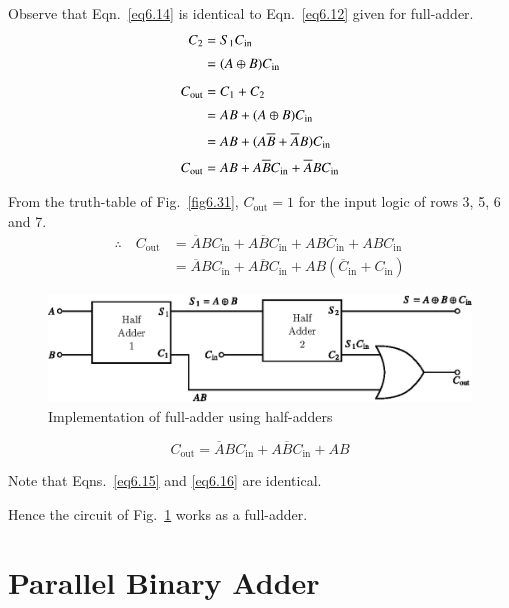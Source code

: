 \eject

Observe that Eqn.~\eqref{eq6.14} is identical to Eqn.~\eqref{eq6.12}
given for full-adder.
\begin{align}
C_{2} &= S_{1}C_{\text{in}}\notag\\[2pt]
&= (A\oplus B)C_{\text{in}}\notag\\[5pt]
C_{\text{out}} &= C_{1}+C_{2}\notag\\[2pt]
&= AB+(A\oplus B)C_{\text{in}}\notag\\[2pt]
&= AB+(A\overline{B}+\overline{A}B)C_{\text{in}}\notag\\[2pt]
C_{\text{out}} &= AB+A\overline{B}C_{\text{in}}+\overline{A}BC_{\text{in}}\label{eq6.15}
\end{align}

From the truth-table of Fig.~\ref{fig6.31}, $C_{\text{out}}=1$ for the
input logic of rows 3, 5, 6 and 7.
\begin{align*}
\therefore\quad C_{\text{out}} &=
\overline{A}BC_{\text{in}}+A\overline{B}C_{\text{in}}+AB\overline{C}_{\text{in}}+ABC_{\text{in}}\\[3pt]
&= \overline{A}BC_{\text{in}}+A\overline{B}C_{\text{in}}+AB(\overline{C}_{\text{in}}+C_{\text{in}})
\end{align*}

\begin{figure}[H]
\centering
\includegraphics{chap6/fig131_6.34.eps}
\caption{Implementation of full-adder using half-adders}\label{fig6.34}
\end{figure}
\begin{equation}
C_{\text{out}}=\overline{A}BC_{\text{in}}+A\overline{B}C_{\text{in}}+AB\label{eq6.16}
\end{equation}

Note that Eqns.~\eqref{eq6.15} and \eqref{eq6.16} are identical.

Hence the circuit of Fig.~\ref{fig6.34} works as a full-adder.

\section{Parallel Binary Adder}\label{sec6.32}

